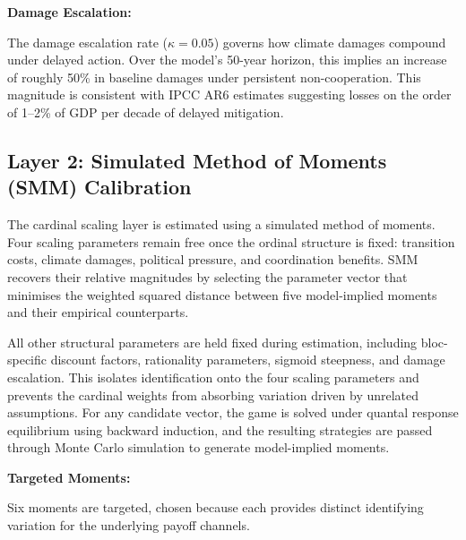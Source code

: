 \documentclass[10pt,a4paper]{article}
\newcommand{\bpar}[1]{\medskip\noindent\textbf{#1}\par}
\begin{document}
\bpar{Damage Escalation:}
The damage escalation rate ($\kappa = 0.05$) governs how climate damages compound under delayed action.
Over the model's 50-year horizon, this implies an increase of roughly 50\% in baseline damages under
persistent non-cooperation. This magnitude is consistent with IPCC AR6 estimates suggesting losses on
the order of 1--2\% of GDP per decade of delayed mitigation.


\FloatBarrier

\needspace{12em}
\subsection{Layer 2: Simulated Method of Moments (SMM) Calibration}

The cardinal scaling layer is estimated using a simulated method of moments. Four scaling parameters
remain free once the ordinal structure is fixed: transition costs, climate damages, political pressure, and
coordination benefits. SMM recovers their relative magnitudes by selecting the parameter vector that
minimises the weighted squared distance between five model-implied moments and their empirical
counterparts.

All other structural parameters are held fixed during estimation, including bloc-specific discount factors,
rationality parameters, sigmoid steepness, and damage escalation. This isolates identification onto the
four scaling parameters and prevents the cardinal weights from absorbing variation driven by unrelated
assumptions. For any candidate vector, the game is solved under quantal response equilibrium using
backward induction, and the resulting strategies are passed through Monte Carlo simulation to generate
model-implied moments.


\FloatBarrier

\bpar{Targeted Moments:}

Six moments are targeted, chosen because each provides distinct identifying variation for the underlying
payoff channels.
\end{document}

